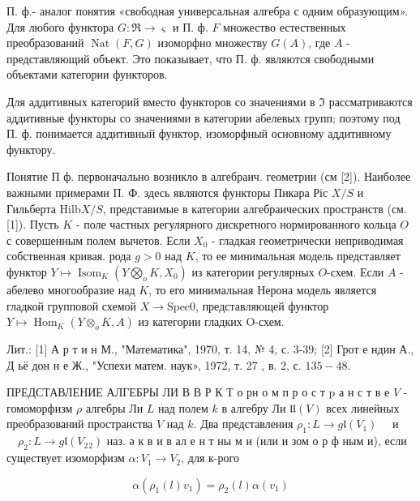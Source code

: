 \documentclass[10pt]{article}
\begin{document}
П. ф.- аналог понятия «свободная универсальная алгебра с одним образующим». Для любого функтора $G: \Re \rightarrow \varsigma$ и П. ф. $F$ множество естественных преобразований $\operatorname{Nat}(F, G)$ изоморфно множеству $G(A)$, где $A$ - представляющий объект. Это показывает, что П. ф. являются свободными объектами категории функторов.



Для аддитивных категорий вместо функторов со значениями в $\Im$ рассматриваются аддитивные функторы со значениями в категории абелевых групп; поэтому под П. ф. понимается аддитивный функтор, изоморфный основному аддитивному функтору.



Понятие П ф. первоначально возникло в алгебраич. геометрии (см [2]). Наиболее важными примерами П. Ф. здесь являются функторы Пикара Ріс $X / S$ и Гильберта $\mathrm{Hilb} X / S$, представимые в категории алгебраических пространств (см. [1]). Пусть $K$ - поле частных регулярного дискретного нормированного кольца $O$ с совершенным полем вычетов. Если $X_{0}$ - гладкая геометрически неприводимая собственная кривая. рода $g>0$ над $K$, то ее минимальная модель представляет функтор $Y \mapsto \operatorname{Isom}_{K}\left(Y \bigotimes_{o} K, X_{0}\right)$ из категории регулярных $O$-схем. Если $A$ - абелево многообразие над $K$, то его минимальная Нерона модель является гладкой групповой схемой $X \rightarrow \mathrm{Spec} 0$, представляющей функтор $Y \mapsto \operatorname{Hom}_{K}\left(Y \otimes_{o} K, A\right)$ из категории гладких O-схем.



Лит.: [1] А р т и н М., "Математика", 1970, т. 14, № 4, с. 3-39; [2] Грот е ндин А., Д ьё дон н е Ж., "Успехи матем. наук», 1972, т. 27 , в. 2, с. $135-48$.



ПРЕДСТАВЛЕНИЕ АЛГЕБРЫ ЛИ В В Р К Т о рн о м п р о с т p а н с т в е $V$ - гомоморфизм $\rho$ алгебры Ли $L$ над полем $k$ в алгебру Ли $\mathfrak{l l}(V)$ всех линейных преобразований пространства $V$ над $k$. Два представления $\rho_{1}: L \rightarrow g \mathfrak{l}\left(V_{1}\right) \quad$ и $\quad \rho_{2}: L \rightarrow g \mathfrak{l}\left(V_{2}{ }_{2}\right)$ наз. ә к в и в ал е н т ны м и (или и зом о р ф ным и), если существует изоморфизм $\alpha: V_{1} \rightarrow V_{2}$, для к-рого



\[

\alpha\left(\rho_{1}(l) v_{1}\right)=\rho_{2}(l) \alpha\left(v_{1}\right)

\]
\end{document}
